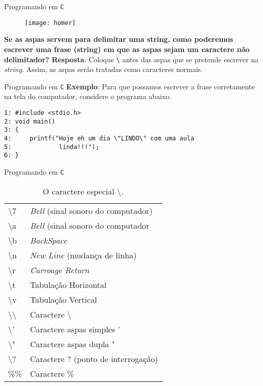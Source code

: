 \documentclass{beamer}
\newcommand{\C}{\texttt{C}}
\newcommand{\barra}{\textbackslash}
\begin{document}
\begin{frame}{Programando em \C}
\begin{figure}
	\centering
	\texttt{[image: homer]}
\end{figure}

\begin{block}{\textbf{Se as aspas servem para delimitar uma string, como poderemos escrever uma frase (string) em que as aspas sejam um caractere não delimitador?}}
\pause \textbf{Resposta}: Coloque \texttt{\barra} antes das aspas que se pretende escrever na \textit{string}. Assim, as aspas serão tratadas como caracteres normais.
\end{block}
\end{frame}

\begin{frame}[fragile]{Programando em \C}
\textbf{Exemplo}: Para que possamos escrever a frase corretamente na tela do computador, considere o programa abaixo.

\begin{verbatim}
1: #include <stdio.h>
2: void main()
3: {
4:     printf("Hoje eh um dia \"LINDO\" com uma aula
5:             linda!!!");
6: }
\end{verbatim}
\end{frame}

\begin{frame}{Programando em \C}
\begin{table}[]
	\centering
	\caption{O caractere especial \barra.}
	\label{my-label}
	\begin{tabular}{l|l}
		\hline
		\barra 7     & \textit{Bell} (sinal sonoro do computador) \\
		\barra a     & \textit{Bell} (sinal sonoro do computador  \\
		\barra b     & \textit{BackSpace}                         \\
		\barra n     & \textit{New Line} (mudança de linha)       \\
		\barra r     & \textit{Carroage Return}                   \\
		\barra t     & Tabulação Horizontal                         \\
		\barra v     & Tabulação Vertical                           \\
		\barra\barra & Caractere \barra                             \\
		\barra '     & Caractere aspas simples '                    \\
		\barra "     & Caractere aspas dupla "                      \\
		\barra ?     & Caractere ? (ponto de interrogação)          \\
		\%\%         & Caractere \%      \\
		\hline                           
	\end{tabular}
\end{table}
\end{frame}
\end{document}

